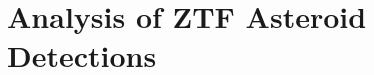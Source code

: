 \documentclass[11pt]{gsasthesis} %
\begin{document}
% 

% 

\chapter{Analysis of ZTF Asteroid Detections}\label{ch:3}


% 

% 



\begin{singlespacing}
\renewcommand{\bibname}{References}

% 
% 

\end{singlespacing}

% 
\end{document}
